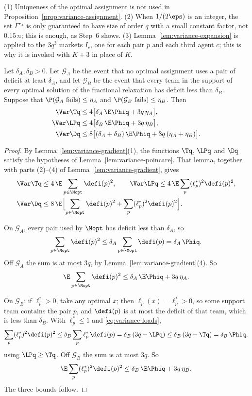 \begin{remark}\label{rem:variance-assignment}
(1) Uniqueness of the optimal assignment is not used in
Proposition~\ref{prop:variance-assignment}. (2) When $1/(2\eps)$ is an integer, the set
$\Gamma^{r_A}$ is only guaranteed to have size of order $q$ with a small constant factor,
not $0.15\,n$; this is enough, as Step~6 shows. (3) Lemma~\ref{lem:variance-expansion} is
applied to the $3q^3$ markets $I_c$, one for each pair $p$ and each third agent $c$; this
is why it is invoked with $K+3$ in place of $K$.
\end{remark}

\begin{proposition}\label{prop:variance-badevent}
Let $\delta_A,\delta_B>0$. Let $\mathcal G_A$ be the event that no optimal assignment uses
a pair of deficit at least $\delta_A$, and let $\mathcal G_B$ be the event that every team
in the support of every optimal solution of the fractional relaxation has deficit less
than $\delta_B$. Suppose that $\P(\mathcal G_A\text{ fails})\le\eta_A$ and
$\P(\mathcal G_B\text{ fails})\le\eta_B$. Then
\begin{align*}
\Var\Tq&\le4\bigl[\delta_A\,\E\Phiq+3q\,\eta_A\bigr],\\
\Var\LPq&\le4\bigl[\delta_B\,\E\Phiq+3q\,\eta_B\bigr],\\
\Var\Dq&\le8\bigl[(\delta_A+\delta_B)\,\E\Phiq+3q\,(\eta_A+\eta_B)\bigr].
\end{align*}
\end{proposition}

\begin{proof}
By Lemma~\ref{lem:variance-gradient}(1), the functions $\Tq$, $\LPq$ and $\Dq$ satisfy
the hypotheses of Lemma~\ref{lem:variance-poincare}. That lemma, together with parts
(2)--(4) of Lemma~\ref{lem:variance-gradient}, gives
\begin{align*}
\Var\Tq&\le4\,\E\sum_{p\in\Mopt}\defi(p)^2,\qquad
\Var\LPq\le4\,\E\sum_p(\ell^*_p)^2\defi(p)^2,\\
\Var\Dq&\le8\,\E\Bigl[\sum_{p\in\Mopt}\defi(p)^2+\sum_p(\ell^*_p)^2\defi(p)^2\Bigr].
\end{align*}

On $\mathcal G_A$, every pair used by $\Mopt$ has deficit less than $\delta_A$, so
\[
\sum_{p\in\Mopt}\defi(p)^2\le\delta_A\sum_{p\in\Mopt}\defi(p)=\delta_A\,\Phiq .
\]
Off $\mathcal G_A$ the sum is at most $3q$, by Lemma~\ref{lem:variance-gradient}(4). So
\[
\E\sum_{p\in\Mopt}\defi(p)^2\le\delta_A\,\E\Phiq+3q\,\eta_A .
\]

On $\mathcal G_B$: if $\ell^*_p>0$, take any optimal $x$; then $\ell_p(x)=\ell^*_p>0$, so
some support team contains the pair $p$, and $\defi(p)$ is at most the deficit of that
team, which is less than $\delta_B$. With $\ell^*_p\le1$ and \eqref{eq:variance-loads},
\[
\sum_p(\ell^*_p)^2\defi(p)^2\le\delta_B\sum_p\ell^*_p\,\defi(p)=\delta_B\,(3q-\LPq)
\le\delta_B\,(3q-\Tq)=\delta_B\,\Phiq,
\]
using $\LPq\ge\Tq$. Off $\mathcal G_B$ the sum is at most $3q$. So
\[
\E\sum_p(\ell^*_p)^2\defi(p)^2\le\delta_B\,\E\Phiq+3q\,\eta_B .
\]
The three bounds follow.
\end{proof}

